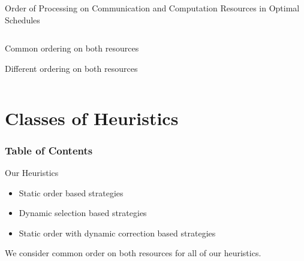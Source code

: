 \documentclass[mathserif,hyperref={pdfpagemode=FullScreen}]{beamer}
\newcommand{\schedule}[3]{
	\draw[->] (-0.2, 0) -- (#1, 0) node[below] {$t$};
	\draw (0, 0) -- (0, 1.5);
	\node at (-0.8, 0.75)[rotate=90] {#2};
	\draw[dashed,gray] (0, 0.75) -- (#1, 0.75);
	\foreach \t in {0,#3} {
		\node[xtick=\t] at (\t, 0){};
	}
}
\begin{document}
\begin{frame}[fragile]{Order of Processing on Communication and Computation Resources in Optimal Schedules}
\begin{columns}
	\begin{column}[c]{.65\linewidth}
\footnotesize
	\begin{block}{Common ordering on both
			resources}
	\end{block}
\begin{block}{Different ordering on both
		resources}
\end{block}
	\end{column}
\end{columns}
\end{frame}

\section{Classes of Heuristics}
\begin{frame}
\frametitle{Table of Contents}
\tableofcontents[currentsection]
\end{frame}

\begin{frame}{Our Heuristics}
\begin{itemize}
	\vfill
	\item Static order based strategies
	\vfill
	\item Dynamic selection based strategies
	\vfill
	\item Static order with dynamic correction based strategies
	\vfill
\end{itemize}
We consider common order on both resources for all of our heuristics.
\end{frame}
\end{document}
